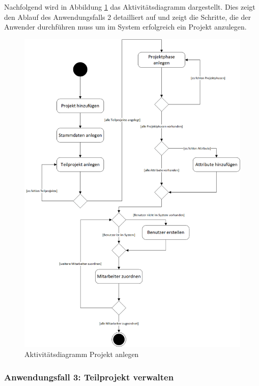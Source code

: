 Nachfolgend wird in Abbildung \ref{fig:AD2} das Aktivitätsdiagramm dargestellt. Dies zeigt den Ablauf des Anwendungsfalls 2 detailliert auf und zeigt die Schritte, die der Anwender durchführen muss um im System erfolgreich ein Projekt anzulegen.
\begin{figure}[h]
    \centering
    \includegraphics[scale=0.67]{./Bilder/AD2_ProjektAnlegen.png}
    \caption[Aktivitätsdiagramm Anwendungsfall 2]{Aktivitätsdiagramm Projekt anlegen}
    \label{fig:AD2}
\end{figure}

\newpage
\subsubsection{Anwendungsfall 3: Teilprojekt verwalten}


